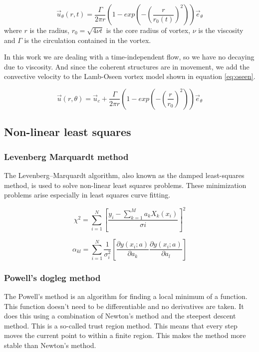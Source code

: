 \documentclass[12pt, a4paper, openany]{memoir}
\begin{document}
\begin{equation}
\label{eq:oseenDecay}
\vec{u}_\theta(r,t) = \frac{\Gamma}{2\pi r} \left( 1 - exp \left( -\left(\frac{r}{r_0(t)}\right)^2\right)\right) \vec{e}_{\theta}
\end{equation}
where $r$ is the radius, $r_0 = \sqrt{4 \nu t}$ is the core radius of vortex, $\nu$ is the viscosity and $\Gamma$ is the circulation contained in the vortex. 

In this work we are dealing with a time-independent flow, so we have no decaying due to viscosity. And since the coherent structures are in movement, we add the convective velocity to the Lamb-Oseen vortex model shown in equation \ref{eq:oseen}.  

\begin{equation}
\label{eq:oseen}
\vec{u}(r,\theta) = \vec{u}_c + \frac{\Gamma}{2\pi r} \left( 1 - exp \left( -\left(\frac{r}{r_0}\right)^2\right)\right) \vec{e}_{\theta}
\end{equation}

\subsection{Non-linear least squares}

\subsubsection{Levenberg Marquardt method}

The Levenberg–Marquardt algorithm, also known as the damped least-squares method, is used to solve non-linear least squares problems. These minimization problems arise especially in least squares curve fitting.

\begin{equation}
\chi^2 = \sum_{i=1}^N \left[ \frac{y_i - \sum_{k=1}^M a_k X_k (x_i)}{\sigma i} \right]^2
\end{equation}

\begin{equation}
\alpha_{kl} = \sum_{i=1}^N \frac{1}{\sigma_i^2} \left[ \frac{\partial y(x_i;a)}{\partial a_k} \frac{\partial y(x_i;a)}{\partial a_l} \right]
\end{equation}

\subsubsection{Powell's dogleg method}

The Powell's method is an algorithm for finding a local minimum of a function. This function doesn't need to be differentiable and no derivatives are taken. It does this using a combination of Newton's method and the steepest descent method. This is a so-called trust region method. This means that every step moves the current point to within a finite region. This makes the method more stable than Newton's method.
\end{document}
